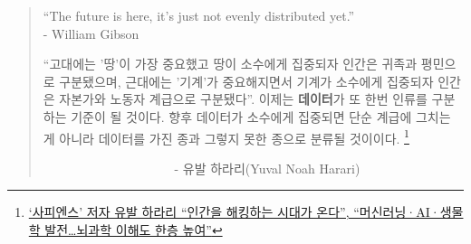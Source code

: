 \documentclass[]{book}
\let\rmarkdownfootnote\footnote%
\def\footnote{\protect\rmarkdownfootnote}
\begin{document}
\begin{quote}
``The future is here, it's just not evenly distributed yet.''\\
\hspace*{0.333em}\hspace*{0.333em}\hspace*{0.333em}\hspace*{0.333em}\hspace*{0.333em}\hspace*{0.333em}\hspace*{0.333em}\hspace*{0.333em}\hspace*{0.333em}\hspace*{0.333em}\hspace*{0.333em}\hspace*{0.333em}\hspace*{0.333em}\hspace*{0.333em}\hspace*{0.333em}\hspace*{0.333em}\hspace*{0.333em}\hspace*{0.333em}\hspace*{0.333em}\hspace*{0.333em}
- William Gibson

``고대에는 '땅'이 가장 중요했고 땅이 소수에게 집중되자 인간은 귀족과
평민으로 구분됐으며, 근대에는 '기계'가 중요해지면서 기계가 소수에게
집중되자 인간은 자본가와 노동자 계급으로 구분됐다''. 이제는
\textbf{데이터}가 또 한번 인류를 구분하는 기준이 될 것이다. 향후
데이터가 소수에게 집중되면 단순 계급에 그치는 게 아니라 데이터를 가진
종과 그렇지 못한 종으로 분류될 것이이다. \footnote{\href{http://news.mk.co.kr/newsRead.php?year=2018\&no=58432}{`사피엔스'
  저자 유발 하라리 ``인간을 해킹하는 시대가 온다'', ``머신러닝·AI·생물학
  발전\ldots{}뇌과학 이해도 한층 높여''}}

~~~~~~~~~~~~~~~~~~~~ - 유발 하라리(Yuval Noah Harari)
\end{quote}


\end{document}
